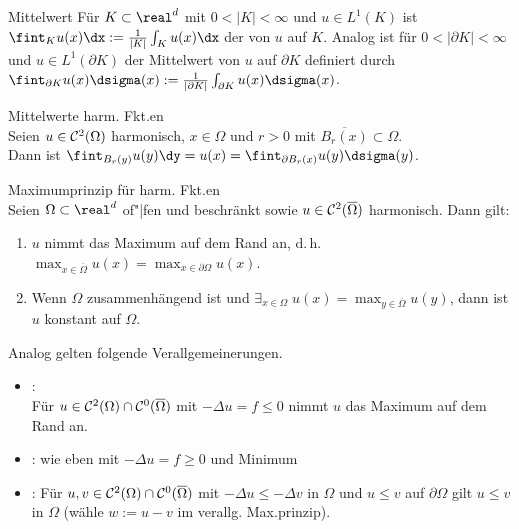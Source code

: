 \begin{Def}{Mittelwert}
    Für $K \subset \real^d$ mit $0 < |K| < \infty$ und $u \in L^1(K)$ ist
    $\fint_K u(x) \dx := \frac{1}{|K|} \int_K u(x) \dx$
    der  von $u$ auf $K$.
    Analog ist für $0 < |\partial K| < \infty$ und $u \in L^1(\partial K)$
    der Mittelwert von $u$ auf $\partial K$ definiert durch
    $\fint_{\partial K} u(x) \dsigma(x) :=
    \frac{1}{|\partial K|} \int_{\partial K} u(x) \dsigma(x)$.
\end{Def}

\begin{Satz}{Mittelwerte harm. Fkt.en}\\
    Seien $u \in \mathcal{C}^2(\Omega)$ harmonisch, $x \in \Omega$ und $r > 0$ mit
    $\overline{B_r(x)} \subset \Omega$.\\
    Dann ist $\fint_{B_r(y)} u(y) \dy = u(x) = \fint_{\partial B_r(x)} u(y) \dsigma(y)$.
\end{Satz}

\linie

\begin{Satz}{Maximumprinzip für harm. Fkt.en}\\
    Seien $\Omega \subset \real^d$ of"|fen und beschränkt sowie
    $u \in \mathcal{C}^2(\overline{\Omega})$ harmonisch.
    Dann gilt:
    \begin{enumerate}
        \item
        $u$ nimmt das Maximum auf dem Rand an, d.\,h.
        $\max_{x \in \overline{\Omega}} u(x) = \max_{x \in \partial\Omega} u(x)$.
        
        \item
        Wenn $\Omega$ zusammenhängend ist und $\exists_{x \in \Omega}\;
        u(x) = \max_{y \in \overline{\Omega}} u(y)$, dann ist $u$ konstant auf $\Omega$.
    \end{enumerate}
\end{Satz}

\begin{Bem}
    Analog gelten folgende Verallgemeinerungen.
    \begin{itemize}
        \item
        :\\
        Für $u \in \mathcal{C}^2(\Omega) \cap \mathcal{C}^0(\overline{\Omega})$ mit $-\Delta u = f \le 0$
        nimmt $u$ das Maximum auf dem Rand an.
        
        \item
        :
        wie eben mit $-\Delta u = f \ge 0$ und Minimum
        
        \item
        :
        Für $u, v \in \mathcal{C}^2(\Omega) \cap \mathcal{C}^0(\overline{\Omega})$ mit $-\Delta u \le -\Delta v$ in
        $\Omega$ und $u \le v$ auf $\partial\Omega$ gilt $u \le v$ in $\Omega$
        (wähle $w := u - v$ im verallg. Max.prinzip).
    \end{itemize}
\end{Bem}

